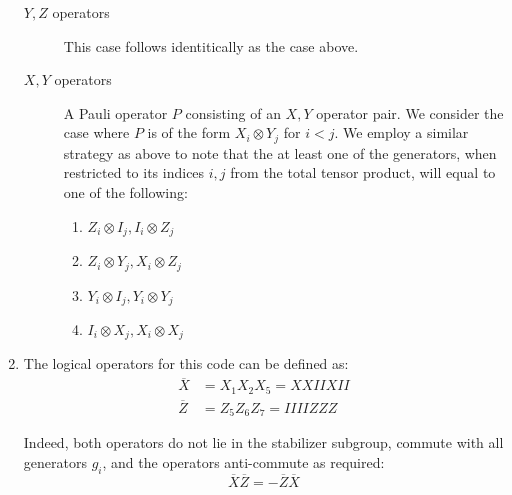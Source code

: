 \documentclass[12pt]{article}%
\begin{document}
\begin{enumerate}
\begin{description}
			\item[$Y,Z$ operators] This case follows identitically as the case above.
			\item[$X,Y$ operators] A Pauli operator $P$ consisting of an $X,Y$ operator pair. We consider the case where $P$ is of the form $X_i \otimes Y_j$ for $i < j$. We employ a similar strategy as above to note that the at least one of the generators, when restricted to its indices $i,j$ from the total tensor product, will equal to one of the following:
				\begin{enumerate}
					\item $Z_i \otimes I_j, I_i \otimes Z_j$
					\item $Z_i \otimes Y_j, X_i \otimes Z_j$
					\item $Y_i \otimes I_j, Y_i \otimes Y_j$
					\item $I_i \otimes X_j, X_i \otimes X_j$
				\end{enumerate}
		\end{description}
	

	\item The logical operators for this code can be defined as:
		\begin{align*}
			\overline{X} & = X_1X_2X_5 = XXIIXII \\
			\overline{Z} & = Z_5Z_6Z_7 = IIIIZZZ 
		\end{align*}

		Indeed, both operators do not lie in the stabilizer subgroup, commute with all generators $g_i$, and the operators anti-commute as required:
		\begin{equation*}
			\overline{X}\overline{Z} = - \overline{Z} \overline{X}
		\end{equation*}


\end{enumerate}
\end{document}
